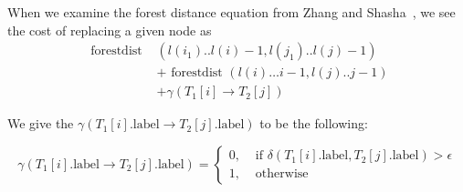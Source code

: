 When we examine the forest distance equation from Zhang and Shasha~\cite{zhang_simple_1989}, we see the cost of replacing a given node as
\begin{align*}
    \text { forestdist } & \left(l\left(i_1\right) . . l(i)-1, l\left(j_1\right) . . l(j)-1\right) \\
                         & + \text { forestdist }(l(i) \ldots i-1, l(j) . . j-1)                   \\
                         & + \gamma\left(T_1[i] \rightarrow T_2[j]\right)
\end{align*}


We give the $\gamma\left(T_1[i].\text{label} \rightarrow T_2[j].\text{label}\right)$ to be the following:

\begin{equation*}
    \gamma\left(T_1[i].\text{label} \rightarrow T_2[j].\text{label}\right)=\left\{\begin{array}{ll}
        0, & \text { if } \delta\left(T_1[i].\text{label}, T_2[j].\text{label}\right)>\epsilon \\
        1, & \text { otherwise }
    \end{array}\right.
\end{equation*}





